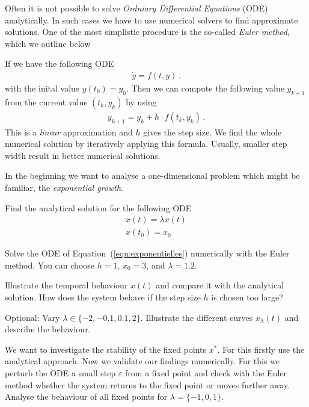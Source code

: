
 \exercise[%
 topic = Numerical Solutions of Differential Equations
  ]

Often it is not possible to solve \emph{Ordniary Differential Equations} (ODE) analytically. In such cases we have to use numerical solvers to find approximate solutions. One of the most simplistic procedure is the so-called \emph{Euler method}, which we outline below

If we have the following ODE
\begin{align}
\dot y = f(t,y)\,.
\end{align}
with the inital value $y(t_0)=y_0$. Then we can compute the following value $y_{k+1}$ from the current value $(t_k,y_k)$ by using
\begin{align}
\dot y_{k+1} =y_k + h\cdot f(t_k,y_k)\,.
\end{align}
This is a \emph{linear} approximation and $h$ gives the step size. We find the whole numerical solution by iteratively applying this formula. Usually, smaller step width result in better numerical solutions. 


 \subexercise[%
  topic={Exponential Growth},
    ]


In the beginning we want to analyse a one-dimensional problem which might be familiar, the \emph{exponential growth}.
		
Find the analytical solution for the following ODE
\begin{align}
\dot x(t) = \lambda x(t)\\
x(t_0)=x_0
\label{eqn:exponentielles}
\end{align}

\subexercise[%
  topic={One-Dimensional Euler Method},
    ]
    
Solve the ODE of Equation~(\ref{eqn:exponentielles}) numerically with the Euler method. You can choose  $h=1$, $x_0=3$, and $\lambda=1.2$.
    
Illustrate the temporal behaviour $x(t)$ and compare it with the analytical solution. How does the system behave if the step size $h$ is chosen too large?


Optional: Vary $\lambda \in \{-2,-0.1,0.1,2\}$. Illustrate the different curves $x_{\lambda}(t)$ and describe the behaviour.


\subexercise[%
  topic={Numerical Stability Analysis},
    ]


We want to investigate the stability of the fixed points $x^{*}$. For this firstly use the analytical approach. Now we validate our findings numerically. For this we perturb the ODE a small step $\varepsilon$ from a fixed point and check with the Euler method whether the system returns to the fixed point or moves further away. Analyse the behaviour of all fixed points for $\lambda = \{-1,0,1\}$.
    

